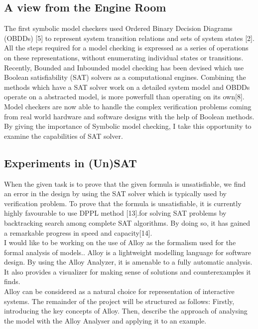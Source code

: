 \documentclass[a4paper,12pt]{extarticle}
\begin{document}
\subsection{A view from the Engine Room}
\label{View from engine}
The first symbolic model checkers used Ordered Binary Decision Diagrams (OBDDs) [5] to represent system transition relations and sets of system states [2]. All the steps required for a model checking is expressed as a series of operations on these representations, without enumerating individual states or transitions. Recently, Bounded and Inbounded model checking has been devised which use Boolean satisfiability (SAT) solvers as a computational engines. Combining the methods which have a SAT solver work on a detailed system model and OBDDs operate on a abstracted model, is more powerfull than operating on its own[8].\\
Model checkers are now able to handle the complex verification problems coming from real world hardware and software designs with the help of Boolean methods. By giving the importance of Symbolic model checking, I take this opportunity to examine the capabilities of SAT solver.
\subsection{Experiments in (Un)SAT}
\label{Expt in UnSAT}
When the given task is to prove that the given formula is unsatisfiable, we find an error in the design by using the SAT solver which is typically used by verification problem. To prove that the formula is unsatisfiable, it is currently highly favourable to use DPPL method [13].for solving SAT problems by backtracking search among complete SAT algorithms. By doing so, it has gained a remarkable progress in speed and capacity[14].\\
I would like to be working on the use of Alloy as the formalism used for the formal analysis of models.. Alloy is a lightweight modelling language for software design. By using the Alloy Analyzer, it is amenable to a fully automatic analysis. It also provides a visualizer for making sense of solutions and counterexamples it finds.\\
Alloy can be considered as a natural choice for representation of interactive systems.  The remainder of the project will be structured as follows: Firstly, introducing the key concepts of Alloy. Then, describe the approach of analysing the model with the Alloy Analyser and applying it to an example. 
\end{document}
